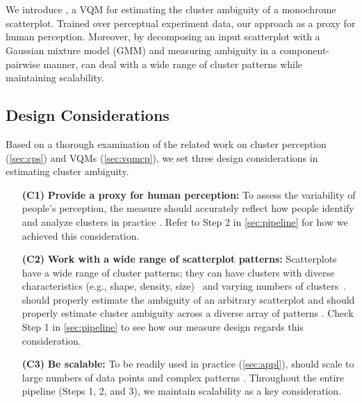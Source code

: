 

\section{\measure}


We introduce \measure, a VQM for estimating the cluster ambiguity of a monochrome scatterplot.
Trained over perceptual experiment data, our approach  as a proxy for human perception.
Moreover, by decomposing an input scatterplot with a Gaussian mixture model (GMM) and measuring ambiguity in a component-pairwise manner, \measure can deal with a wide range of cluster patterns while maintaining scalability. 

\subsection{Design Considerations}



\label{sec:decon}

Based on a thorough examination of the related work on cluster perception (\autoref{sec:cps}) and VQMs (\autoref{sec:vqmcp}), we set three design considerations in estimating cluster ambiguity.


\begin{itemize}[noitemsep] %
    \item[\textbf{(C1)}] \textbf{Provide a proxy for human perception:} To assess the variability of people's perception, the measure should accurately reflect how people identify and analyze clusters in practice \cite{quadri21tvcg, abbas19cgf, aupetit19vis}. 
    Refer to Step 2 in \autoref{sec:pipeline} for how we achieved this consideration.
    \item[\textbf{(C2)}] \textbf{Work with a wide range of scatterplot patterns:} Scatterplots
    have a wide range of cluster patterns; they can have clusters with diverse characteristics (e.g., shape, density, size)~\cite{jeon22tvcg} and varying numbers of clusters~\cite{quadri21tvcg}. 
    \measure should 
    properly estimate the ambiguity of an arbitrary scatterplot and should properly estimate cluster ambiguity across a diverse array of patterns
    \cite{quadri21tvcg, abbas19cgf}. 
    Check Step 1 in \autoref{sec:pipeline} to see how our measure design regards this consideration.
    \item[\textbf{(C3)}] \textbf{Be scalable:} To be readily used in practice (\autoref{sec:appl}), 
    \measure should scale to large numbers of data points and complex patterns \cite{abbas19cgf}. 
    Throughout the entire pipeline (Steps 1, 2, and 3), we maintain scalability as a key consideration.
\end{itemize}

